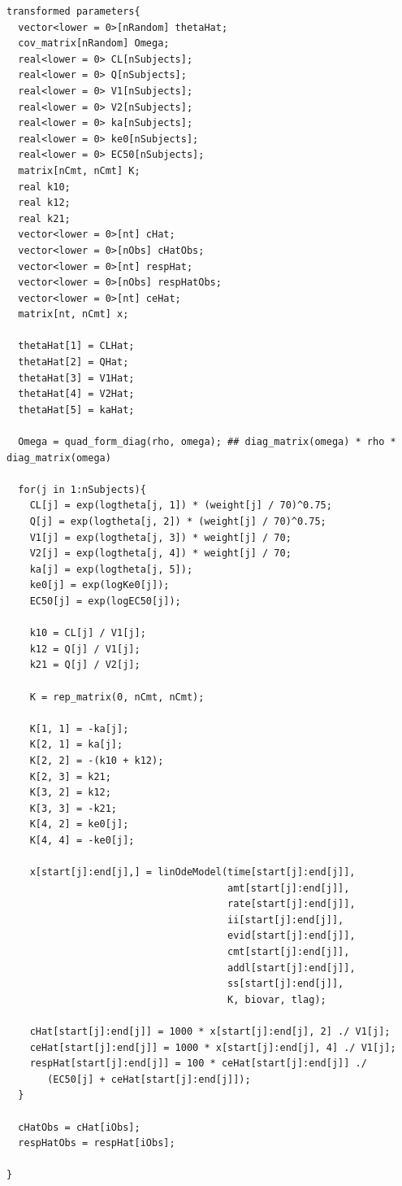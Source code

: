 \documentclass[11pt, reqno, oneside]{amsbook}
\numberwithin{equation}{chapter}
\numberwithin{figure}{chapter}
\numberwithin{table}{chapter}
\theoremstyle{remark}
\begin{document}
\begin{verbatim}
transformed parameters{
  vector<lower = 0>[nRandom] thetaHat;
  cov_matrix[nRandom] Omega;
  real<lower = 0> CL[nSubjects];
  real<lower = 0> Q[nSubjects];
  real<lower = 0> V1[nSubjects];
  real<lower = 0> V2[nSubjects];
  real<lower = 0> ka[nSubjects];
  real<lower = 0> ke0[nSubjects];
  real<lower = 0> EC50[nSubjects];
  matrix[nCmt, nCmt] K;
  real k10;
  real k12;
  real k21;
  vector<lower = 0>[nt] cHat;
  vector<lower = 0>[nObs] cHatObs;
  vector<lower = 0>[nt] respHat;
  vector<lower = 0>[nObs] respHatObs;
  vector<lower = 0>[nt] ceHat;
  matrix[nt, nCmt] x;

  thetaHat[1] = CLHat;
  thetaHat[2] = QHat;
  thetaHat[3] = V1Hat;
  thetaHat[4] = V2Hat;
  thetaHat[5] = kaHat;

  Omega = quad_form_diag(rho, omega); ## diag_matrix(omega) * rho * diag_matrix(omega)

  for(j in 1:nSubjects){
    CL[j] = exp(logtheta[j, 1]) * (weight[j] / 70)^0.75;
    Q[j] = exp(logtheta[j, 2]) * (weight[j] / 70)^0.75;
    V1[j] = exp(logtheta[j, 3]) * weight[j] / 70;
    V2[j] = exp(logtheta[j, 4]) * weight[j] / 70;
    ka[j] = exp(logtheta[j, 5]);
    ke0[j] = exp(logKe0[j]);
    EC50[j] = exp(logEC50[j]);

    k10 = CL[j] / V1[j];
    k12 = Q[j] / V1[j];
    k21 = Q[j] / V2[j];

    K = rep_matrix(0, nCmt, nCmt);

    K[1, 1] = -ka[j];
    K[2, 1] = ka[j];
    K[2, 2] = -(k10 + k12);
    K[2, 3] = k21;
    K[3, 2] = k12;
    K[3, 3] = -k21;
    K[4, 2] = ke0[j];
    K[4, 4] = -ke0[j];

    x[start[j]:end[j],] = linOdeModel(time[start[j]:end[j]],
                                      amt[start[j]:end[j]],
                                      rate[start[j]:end[j]],
                                      ii[start[j]:end[j]],
                                      evid[start[j]:end[j]],
                                      cmt[start[j]:end[j]],
                                      addl[start[j]:end[j]],
                                      ss[start[j]:end[j]],
                                      K, biovar, tlag);

    cHat[start[j]:end[j]] = 1000 * x[start[j]:end[j], 2] ./ V1[j];
    ceHat[start[j]:end[j]] = 1000 * x[start[j]:end[j], 4] ./ V1[j];
    respHat[start[j]:end[j]] = 100 * ceHat[start[j]:end[j]] ./ 
       (EC50[j] + ceHat[start[j]:end[j]]);
  }

  cHatObs = cHat[iObs];
  respHatObs = respHat[iObs];

}
\end{verbatim}
\end{document}
